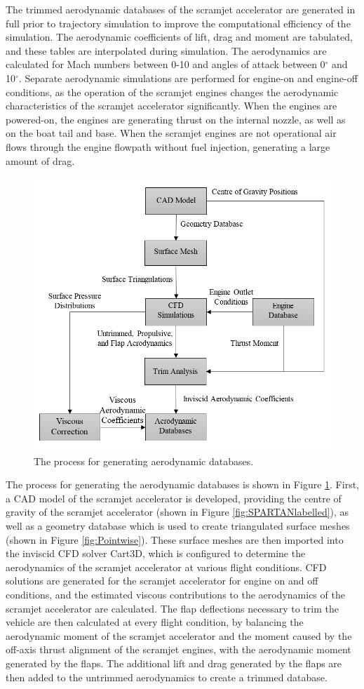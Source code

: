 The trimmed aerodynamic databases of the scramjet accelerator are generated in full prior to trajectory simulation to improve the computational efficiency of the simulation. The aerodynamic coefficients of lift, drag and moment are tabulated, and these tables are interpolated during simulation. 
The aerodynamics are calculated for Mach numbers between 0-10 and angles of attack between 0$^\circ$ and 10$^\circ$. Separate aerodynamic simulations are performed for engine-on and engine-off conditions, as the operation of the scramjet engines changes the aerodynamic characteristics of the scramjet accelerator significantly. When the engines are powered-on, the engines are generating thrust on the internal nozzle, as well as on the boat tail and base.  When the scramjet engines are not operational air flows through the engine flowpath without fuel injection, generating a large amount of drag. 
\begin{figure}[ht]
	\centering
	\includegraphics[width=0.7\linewidth]{figures/3_vehicle_design/FlowChart}
	\caption{The process for generating aerodynamic databases.}
	\label{fig:FlowChart}
\end{figure}

The process for generating the aerodynamic databases is shown in Figure \ref{fig:FlowChart}. First, a CAD model of the scramjet accelerator is developed, providing the centre of gravity of the scramjet accelerator (shown in Figure \ref{fig:SPARTANlabelled}), as well as a geometry database which is used to create triangulated surface meshes (shown in Figure \ref{fig:Pointwise}). These surface meshes are then imported into the inviscid CFD solver Cart3D\cite{CART3D}, which is configured to determine the aerodynamics of the scramjet accelerator at various flight conditions. CFD solutions are generated for the scramjet accelerator for engine on and off conditions, and the estimated viscous contributions to the aerodynamics of the scramjet accelerator are calculated.
The flap deflections necessary to trim the vehicle are then calculated at every flight condition, by balancing the aerodynamic moment of the scramjet accelerator and the moment caused by the off-axis thrust alignment of the scramjet engines, with the aerodynamic moment generated by the flaps. 
The additional lift and drag generated by the flaps are then added to the untrimmed aerodynamics to create a trimmed database.







